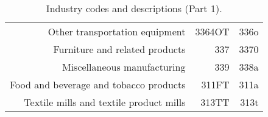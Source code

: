 \begin{landscape}
\begin{table}[h]
\begin{center}
\begin{tabular}{rrr}
Other transportation equipment                                       & 3364OT      & 336o      \\%
Furniture and related products                                       & 337         & 3370      \\%
Miscellaneous manufacturing                                          & 339         & 338a      \\%
Food and beverage and tobacco products                               & 311FT       & 311a      \\%
Textile mills and textile product mills                              & 313TT       & 313t      \\%
\hline\hline
\end{tabular}
\end{center}
\caption{\label{tab:industries_1}Industry codes and descriptions (Part 1).}
\end{table}



\end{landscape}

